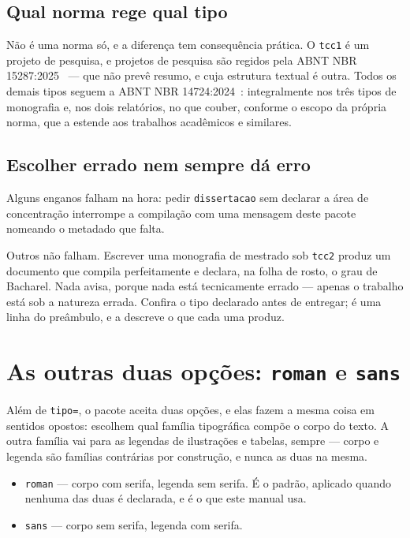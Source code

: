 \subsection{Qual norma rege qual tipo}\label{ssc:norma-por-tipo}

Não é uma norma só, e a diferença tem consequência prática. O \texttt{tcc1} é um projeto de
pesquisa, e projetos de pesquisa são regidos pela ABNT NBR 15287:2025~\cite{nbr15287:2025} --- que
não prevê resumo, e cuja estrutura textual é outra. Todos os demais tipos seguem a ABNT NBR
14724:2024~\cite{nbr14724:2024}: integralmente nos três tipos de monografia e, nos dois relatórios,
no que couber, conforme o escopo da própria norma, que a estende aos trabalhos acadêmicos e
similares.

\subsection{Escolher errado nem sempre dá erro}\label{ssc:escolher-errado}

Alguns enganos falham na hora: pedir \texttt{dissertacao} sem declarar a área de concentração
interrompe a compilação com uma mensagem deste pacote nomeando o metadado que falta.

Outros não falham. Escrever uma monografia de mestrado sob \texttt{tcc2} produz um documento que
compila perfeitamente e declara, na folha de rosto, o grau de Bacharel. Nada avisa, porque nada
está tecnicamente errado --- apenas o trabalho está sob a natureza errada. Confira o tipo declarado
antes de entregar; é uma linha do preâmbulo, e a  descreve o que cada uma
produz.

\section{As outras duas opções: \texttt{roman} e \texttt{sans}}\label{sec:opcoes-fonte}

Além de \texttt{tipo=}, o pacote aceita duas opções, e elas fazem a mesma coisa em sentidos
opostos: escolhem qual família tipográfica compõe o corpo do texto. A outra família vai para as
legendas de ilustrações e tabelas, sempre --- corpo e legenda são famílias contrárias por
construção, e nunca as duas na mesma.

\begin{itemize}
    \item \texttt{roman} --- corpo com serifa, legenda sem serifa. É o padrão, aplicado quando
          nenhuma das duas é declarada, e é o que este manual usa.
    \item \texttt{sans} --- corpo sem serifa, legenda com serifa.
\end{itemize}

